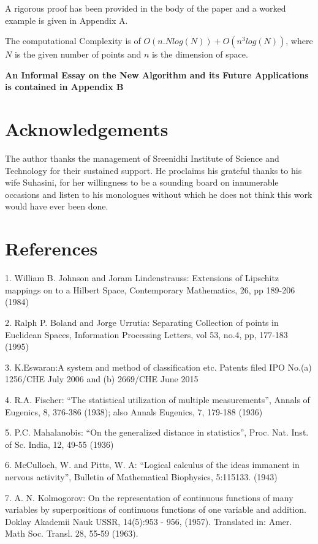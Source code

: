 \documentclass[english]{article}
\begin{document}
A rigorous proof has been provided in the body of the paper and a worked example is given in Appendix A.

 The computational Complexity is of $O(n.Nlog(N))+O(n^{3}log(N))$, where $N$ is the given number of points and $n$ is the dimension of space.

\textbf{An Informal Essay on the New Algorithm and its Future Applications is contained in Appendix B}

\section{Acknowledgements}

The author thanks the management of Sreenidhi Institute of Science
and Technology for their sustained support. He proclaims his grateful
thanks to his wife Suhasini, for her willingness to be a sounding
board on innumerable occasions and listen to his monologues without
which he does not think this work would have ever been done.


\section{References}

1. William B. Johnson and Joram Lindenstrauss: Extensions of Lipschitz
mappings on to a Hilbert Space, Contemporary Mathematics, 26, pp 189-206
(1984)

2. Ralph P. Boland and Jorge Urrutia: Separating Collection of points
in Euclidean Spaces, Information Processing Letters, vol 53, no.4,
pp, 177-183 (1995)

3. K.Eswaran:A system and method of classification etc. Patents filed
IPO No.(a) 1256/CHE July 2006 and (b) 2669/CHE June 2015

4. R.A. Fischer: {}``The statistical utilization of multiple
measurements'', Annals of Eugenics, 8, 376-386 (1938); also Annals
Eugenics, 7, 179-188 (1936)

5. P.C. Mahalanobis: {}``On the generalized distance in statistics'',
Proc. Nat. Inst. of Sc. India, 12, 49-55 (1936)

6. McCulloch, W. and Pitts, W. A: {}``Logical calculus of the
ideas immanent in nervous activity'', Bulletin of Mathematical Biophysics,
5:115\textendash{}133. (1943)

7. A. N. Kolmogorov: On the representation of continuous functions
of many variables by superpositions of continuous functions of one
variable and addition. Doklay Akademii Nauk USSR, 14(5):953 - 956,
(1957). Translated in: Amer. Math Soc. Transl. 28, 55-59 (1963).
\end{document}

